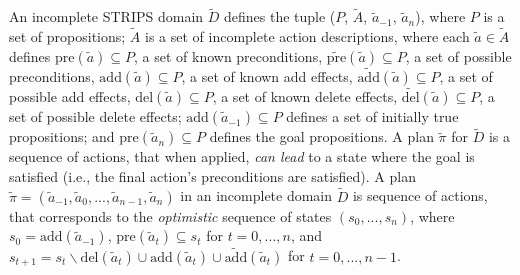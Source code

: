 \documentclass{article}
\newtheorem{definition}[theorem]{Definition}
\newenvironment{packed_itemize}{
\begin{itemize}
  \setlength{\itemsep}{1pt}
  \setlength{\parskip}{0pt}
  \setlength{\parsep}{0pt}
}{\end{itemize}}
\begin{document}
An incomplete STRIPS domain $\tilde{D}$  defines the tuple ($P$, $\tilde{A}$, $\tilde{a}_{-1}$,
$\tilde{a}_{n}$), where $P$ is a  set of propositions; $\tilde{A}$ is a set of incomplete action descriptions, where each $\tilde{a} \in \tilde{A}$ defines $\text{pre}(\tilde{a}) \subseteq P$, a set of known preconditions, $\widetilde{\text{pre}}(\tilde{a}) \subseteq P$, a set of possible preconditions, $\text{add}(\tilde{a}) \subseteq P$, a set of known add effects,  $\widetilde{\text{add}}(\tilde{a}) \subseteq P$, a set of possible add effects, $\text{del}(\tilde{a}) \subseteq P$, a set of known delete effects, $\widetilde{\text{del}}(\tilde{a}) \subseteq P$, a set of possible delete effects; $\text{add}(\tilde{a}_{-1}) \subseteq P$ defines a set of initially true propositions; and $\text{pre}(\tilde{a}_n) \subseteq P$ defines the goal propositions.
%
A plan $\tilde{\pi}$ for $\tilde{D}$ is a sequence of actions, that when applied, {\em can lead} to a state where the goal is satisfied (i.e., the final action's preconditions are satisfied).  A plan $\tilde{\pi} = (\tilde{a}_{-1}, \tilde{a}_0, ..., \tilde{a}_{n-1}, \tilde{a}_{n})$ in an incomplete domain $\tilde{D}$ is sequence of actions, that corresponds to the {\em optimistic} sequence of states $(s_0, ..., s_n)$, where $s_0 = \text{add}(\tilde{a}_{-1})$, $\text{pre}(\tilde{a}_t) \subseteq s_t$ for $t = 0,..., n$, and $s_{t+1} = s_t \backslash \text{del}(\tilde{a}_t) \cup \text{add}(\tilde{a}_t) \cup \widetilde{\text{add}}(\tilde{a}_t)$ for $t = 0,..., n-1$.
\end{document}
